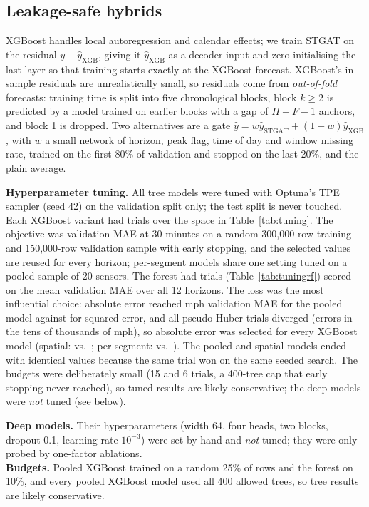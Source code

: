 \documentclass[conference]{IEEEtran}
\begin{document}
\subsection{Leakage-safe hybrids}
XGBoost handles local autoregression and calendar effects; we train STGAT on the residual $y-\hat y_{\mathrm{XGB}}$, giving it $\hat y_{\mathrm{XGB}}$ as a decoder input and zero-initialising the last layer so that training starts exactly at the XGBoost forecast.
XGBoost's in-sample residuals are unrealistically small, so residuals come from \emph{out-of-fold} forecasts: training time is split into five chronological blocks, block $k\ge2$ is predicted by a model trained on earlier blocks with a gap of $H+F-1$ anchors, and block 1 is dropped.
Two alternatives are a gate $\hat y=w\hat y_{\mathrm{STGAT}}+(1-w)\hat y_{\mathrm{XGB}}$, with $w$ a small network of horizon, peak flag, time of day and window missing rate, trained on the first 80\% of validation and stopped on the last 20\%, and the plain average.

\textbf{Hyperparameter tuning.} All tree models were tuned with Optuna's TPE sampler (seed 42) on the validation split only; the test split is never touched.
Each XGBoost variant had \tuneTrialsGlobal{} trials over the space in Table~\ref{tab:tuning}.
The objective was validation MAE at 30 minutes on a random 300,000-row training and 150,000-row validation sample with early stopping, and the selected values are reused for every horizon; per-segment models share one setting tuned on a pooled sample of 20 sensors.
The forest had \tuneTrialsRf{} trials (Table~\ref{tab:tuningrf}) scored on the mean validation MAE over all 12 horizons.
The loss was the most influential choice: absolute error reached \tuneAbsGlobal{} mph validation MAE for the pooled model against \tuneSqGlobal{} for squared error, and all \tuneHubTrialsGlobal{} pseudo-Huber trials diverged (errors in the tens of thousands of mph), so absolute error was selected for every XGBoost model (spatial: \tuneAbsSpatial{} vs.\ \tuneSqSpatial{}; per-segment: \tuneAbsSegment{} vs.\ \tuneSqSegment{}).
The pooled and spatial models ended with identical values because the same trial won on the same seeded search.
The budgets were deliberately small (15 and 6 trials, a 400-tree cap that early stopping never reached), so tuned results are likely conservative; the deep models were \emph{not} tuned (see below).


\textbf{Deep models.} Their hyperparameters (width 64, four heads, two blocks, dropout 0.1, learning rate $10^{-3}$) were set by hand and \emph{not} tuned; they were only probed by one-factor ablations.\\
\textbf{Budgets.} Pooled XGBoost trained on a random 25\% of rows and the forest on 10\%, and every pooled XGBoost model used all 400 allowed trees, so tree results are likely conservative.
\end{document}
